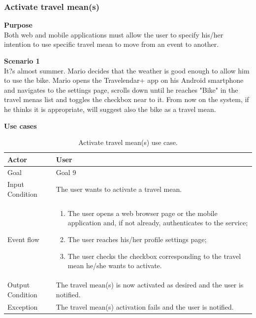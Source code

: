 \documentclass{article}
\begin{document}
	\subsubsection{Activate travel mean(s)}
	
	\bigskip
	\noindent
	\textbf{Purpose} \\
	Both web and mobile applications must allow the user to specify his/her intention to use specific travel mean to move from an event to another.
	
	\bigskip
	\noindent
	\textbf{Scenario 1} \\
	It?s almost summer. Mario decides that the weather is good enough to allow him to use the bike. Mario opens the Travelendar+ app on his Android smartphone and navigates to the settings page, scrolls down until he reaches "Bike" in the travel menas list and toggles the checkbox near to it. From now on the system, if he thinks it is appropriate, will suggest also the bike as a travel mean.
	
	\bigskip
	\noindent
	\textbf{Use cases} \\
	
	\begin{table}[htp]
	\caption{Activate travel mean(s) use case.}
		\begin{center}
    			\begin{tabular}{p{}|p{}}
   			 	\hline
    				Actor & User \\ \hline
    				Goal & Goal 9 \\ \hline
    				Input Condition & The user wants to activate a travel mean. \\ \hline
    				Event flow & 
				\begin{enumerate}
  					\item The user opens a web browser page or the mobile application and, if not already, authenticates to the service;
  					\item The user reaches his/her profile settings page;
  					\item The user checks the checkbox corresponding to the travel mean he/she wants to activate.
 				 \end{enumerate} \\ \hline
    				Output Condition & The travel mean(s) is now activated as desired and the user is notified. \\ \hline
    				Exception & The travel mean(s) activation fails and the user is notified. \\ \hline
    			\end{tabular}
		\end{center}
	\end{table}
	
\end{document}
